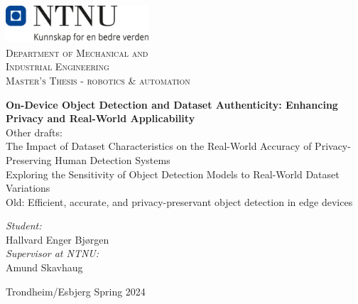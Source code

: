 \begin{titlepage}
\vbox{ }
\vbox{ }
\begin{center}
{\includegraphics[width=0.40\textwidth]{Images/NTNU_logo.png}}\\[1cm]
\textsc{\LARGE Department of Mechanical and  }\\[0.3cm]
\textsc{\LARGE Industrial Engineering}\\[1.5cm]
\textsc{\Large Master's Thesis - robotics \& automation}\\[0.5cm]
\vbox{ }

{ \huge \bfseries On-Device Object Detection and Dataset Authenticity: Enhancing Privacy and Real-World Applicability}
\\[0.5cm]
Other drafts:\\
The Impact of Dataset Characteristics on the Real-World Accuracy of Privacy-Preserving Human Detection Systems\\
Exploring the Sensitivity of Object Detection Models to Real-World Dataset Variations\\
Old: Efficient, accurate, and privacy-preservant object detection in edge devices
\\[2.5cm] 



\large


\emph{Student:}\\
Hallvard Enger Bjørgen\\
\vspace{1cm}
\emph{Supervisor at NTNU:}\\
Amund Skavhaug
\vfill

{\large Trondheim/Esbjerg Spring 2024}
\end{center}
\end{titlepage}